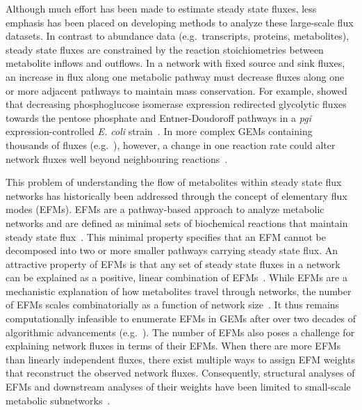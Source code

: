 \documentclass[12pt]{article}
\begin{document}
Although much effort has been made to estimate steady state fluxes, less
emphasis has been placed on developing methods to analyze these
large-scale flux datasets. In contrast to abundance data (e.g.\
transcripts, proteins, metabolites), steady state fluxes are constrained
by the reaction stoichiometries between metabolite inflows and outflows.
In a network with fixed source and sink fluxes, an increase in flux along
one metabolic pathway must decrease fluxes along one or more adjacent
pathways to maintain mass conservation. For example,
\citeauthor{UsuiYuki2012Iteo} showed that decreasing phosphoglucose
isomerase expression redirected glycolytic fluxes towards the pentose
phosphate and Entner-Doudoroff pathways in a \textit{pgi}
expression-controlled \textit{E. coli}
strain~\citep{UsuiYuki2012Iteo}. In more complex GEMs containing
thousands of fluxes (e.g.\
\cite{BrunkElizabeth2018Reat,RobinsonJonathanL2020Aaoh,WangHao2021Gmnr}),
however, a change in one reaction rate could alter network fluxes
well beyond neighbouring reactions~\citep{NobileMarcoS2021Agsa}.

This problem of understanding the flow of metabolites within steady state
flux networks has historically been addressed through the concept of
elementary flux modes (EFMs). EFMs are a pathway-based approach to analyze
metabolic networks and are defined as minimal sets of biochemical
reactions that maintain steady state flux~\citep{SchusterStefan1994Oefm}.
This minimal property specifies that an EFM cannot be decomposed into two
or more smaller pathways carrying steady state flux. An attractive
property of EFMs is that any set of steady state fluxes in a network can
be explained as a positive, linear combination of
EFMs~\citep{SchusterStefan1999Doef}. While EFMs are a mechanistic
explanation of how metabolites travel through networks, the number of EFMs
scales combinatorially as a function of network
size~\citep{AcunaVicente2009Maci}. It thus remains computationally
infeasible to enumerate EFMs in GEMs after over two decades of algorithmic
advancements (e.g.\
\citealt{GagneurJulien2004Coem,TerzerMarco2008Lcoe,BuchnerBiancaA2021EaPp}).
The number of EFMs also poses a challenge for explaining network fluxes in
terms of their EFMs. When there are more EFMs than linearly independent
fluxes, there exist multiple ways to assign EFM weights that reconstruct
the observed network fluxes. Consequently, structural analyses of EFMs and
downstream analyses of their weights have been limited to small-scale
metabolic
subnetworks~\citep{FakihIbrahim2023Dgmm,MpabanziLiliane2022Frca,ToyaYoshihiro2022Mpef,MatsudaFumio2011Esoy,SchwartzJean-Marc2006Qema}.
\end{document}
